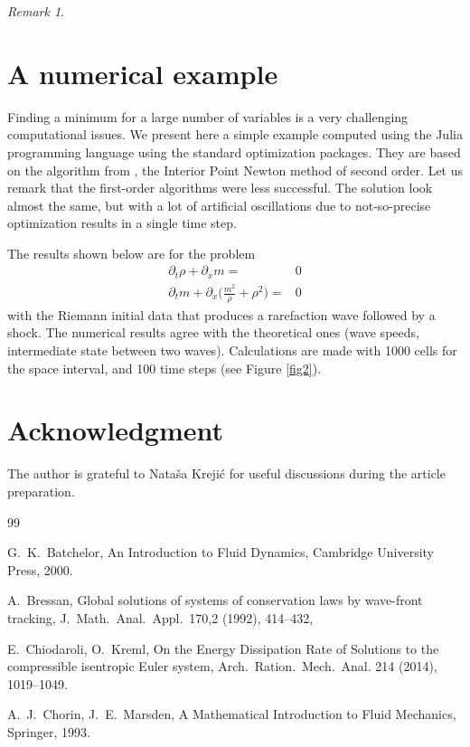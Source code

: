 \documentclass[11pt,a4paper,reqno]{amsart}
\theoremstyle{plain}
\theoremstyle{definition}
\theoremstyle{remark}
\newtheorem{remark}{Remark}[section]
\numberwithin{equation}{section}
\begin{document}
{\begin{remark}
\section{A numerical example}

Finding a minimum for a large number of variables is a very
challenging computational issues.
We present here a simple example computed using the Julia programming language
using the standard optimization packages.
They are based on the algorithm from \cite{WB}, the Interior
Point Newton method of second order. Let us remark that the first-order 
algorithms were less successful. The solution look almost the same, 
but with a lot of artificial
oscillations due to not-so-precise optimization results in a single time step.

The results shown below are for the problem
\[
\begin{split}
\partial_{t}\rho + \partial_{x}m = & 0 \\
\partial_{t}m + \partial_{x}\Big( \frac{m^{2}}{\rho}+\rho^{2}\Big) = & 0 	
\end{split}
\]  
with the Riemann initial data that produces 
a rarefaction wave followed by a shock.
The numerical results agree with the theoretical ones (wave speeds,
intermediate state between two waves). Calculations are made with 
1000 cells for the space interval, and 100 time steps (see Figure \ref{fig2}).
\end{remark}

\section*{Acknowledgment}
The author is grateful to Nata\v{s}a Kreji\'{c} for useful discussions
during the article preparation. 

\begin{thebibliography}{99}


 G.\ K.\ Batchelor, An Introduction to Fluid Dynamics,
Cambridge University Press, 2000.

 A.\ Bressan,
Global solutions of systems of conservation laws by wave-front tracking,
J.\ Math.\ Anal.\ Appl.\ 170,2 (1992), 414--432,

 E.\ Chiodaroli, O.\ Kreml, 
{On the Energy Dissipation Rate of
Solutions to the compressible isentropic Euler system}, Arch.\ Ration.\
Mech.\ Anal. 214 (2014), 1019--1049.

 A.\ J.\ Chorin, J.\ E.\ Marsden, A Mathematical Introduction to Fluid Mechanics, Springer, 1993.


\end{thebibliography}}
\end{document}
